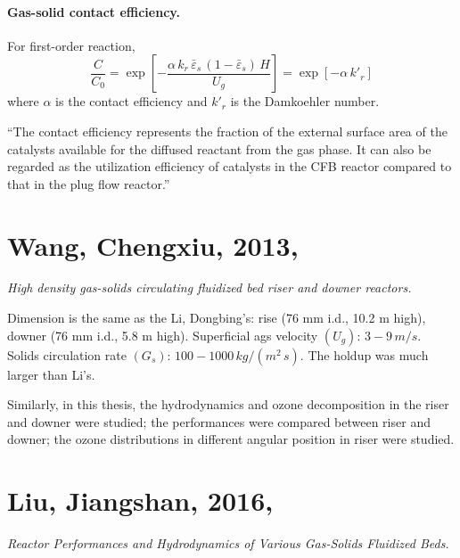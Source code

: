 \paragraph{Gas-solid contact efficiency. }
For first-order reaction,
\begin{equation}
    \frac{C}{C_0} 
    = \exp\left[ 
        -\frac{\alpha\,k_r\,\bar{\varepsilon}_s\, (1-\bar{\varepsilon}_s)\,H}{U_g} 
        \right]
    = \exp\left[ -\alpha\,k'_r \right]
\end{equation}
where $\alpha$ is the contact efficiency and $k'_r$ is the Damkoehler number.

``The contact efficiency represents the fraction of the external surface area of the catalysts available for the diffused reactant from the gas phase. 
It can also be regarded as the utilization efficiency of catalysts in the CFB reactor compared to that in the plug flow reactor.''



%
%
\section[Wang, Chengxiu, 2013]{Wang, Chengxiu, 2013, \cite{wangcx2013}}
\textit{High density gas-solids circulating fluidized bed riser and downer reactors.}

Dimension is the same as the Li, Dongbing's: rise (76 mm i.d., 10.2 m high), downer (76 mm i.d., 5.8 m high). 
Superficial ags velocity $(U_g)$: $3-9\,\si{m/s}$. 
Solids circulation rate $(G_s)$: $100-1000\,\si{kg/(m^2\,s)}$. 
The holdup was much larger than Li's.

Similarly, in this thesis, the hydrodynamics and ozone decomposition in the riser and downer were studied;
the performances were compared between riser and downer; 
the ozone distributions in different angular position in riser were studied.

%
%
\section[Liu, Jiangshan, 2016]{Liu, Jiangshan, 2016, \cite{liujs2016}}
\textit{Reactor Performances and Hydrodynamics of Various Gas-Solids Fluidized Beds.}